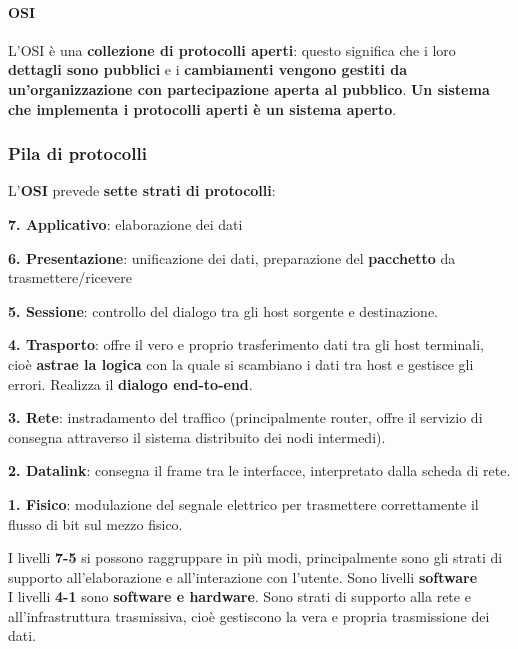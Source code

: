\documentclass[10pt]{article}
\begin{document}
\paragraph{OSI} L'OSI è una \textbf{collezione di protocolli aperti}: questo significa che i loro \textbf{dettagli sono pubblici} e i \textbf{cambiamenti vengono gestiti da un'organizzazione con partecipazione aperta al pubblico}. \textbf{Un sistema che implementa i protocolli aperti è un sistema aperto}.
\subsubsection{Pila di protocolli} L'\textbf{OSI} prevede \textbf{sette strati di protocolli}: 
\begin{list}{}{}
\item\textbf{7. Applicativo}: elaborazione dei dati
\item\textbf{6. Presentazione}: unificazione dei dati, preparazione del \textbf{pacchetto} da trasmettere/ricevere
\item\textbf{5. Sessione}:  controllo del dialogo tra gli host sorgente e destinazione.
\item\textbf{4. Trasporto}: offre il vero e proprio trasferimento dati tra gli host terminali, cioè \textbf{astrae la logica} con la quale si scambiano i dati tra host e gestisce gli errori. Realizza il \textbf{dialogo end-to-end}.
\item\textbf{3. Rete}: instradamento del traffico (principalmente router, offre il servizio di consegna attraverso il sistema distribuito dei nodi intermedi).
\item\textbf{2. Datalink}: consegna il frame tra le interfacce, interpretato dalla scheda di rete.
\item\textbf{1. Fisico}: modulazione del segnale elettrico per trasmettere correttamente il flusso di bit sul mezzo fisico.
\end{list}
I livelli \textbf{7-5} si possono raggruppare in più modi, principalmente sono gli strati di supporto all'elaborazione e all'interazione con l'utente. Sono livelli \textbf{software}\\
I livelli \textbf{4-1} sono \textbf{software e hardware}. Sono strati di supporto alla rete e all'infrastruttura trasmissiva, cioè gestiscono la vera e propria trasmissione dei dati.
\pagebreak
\end{document}
